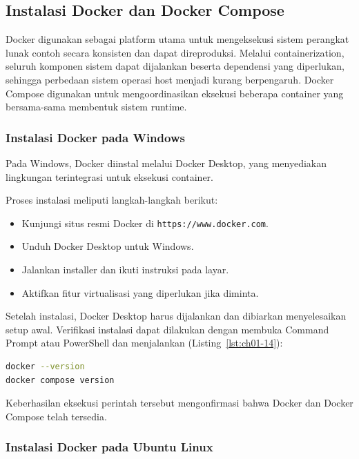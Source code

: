 \subsection{Instalasi Docker dan Docker Compose}

Docker digunakan sebagai platform utama untuk mengeksekusi sistem perangkat lunak
contoh secara konsisten dan dapat direproduksi. Melalui containerization, seluruh
komponen sistem dapat dijalankan beserta dependensi yang diperlukan, sehingga
perbedaan sistem operasi host menjadi kurang berpengaruh. Docker Compose digunakan
untuk mengoordinasikan eksekusi beberapa container yang bersama-sama membentuk
sistem runtime.

\subsubsection{Instalasi Docker pada Windows}

Pada Windows, Docker diinstal melalui Docker Desktop, yang menyediakan lingkungan
terintegrasi untuk eksekusi container.

Proses instalasi meliputi langkah-langkah berikut:

\begin{itemize}
  \item Kunjungi situs resmi Docker di \texttt{https://www.docker.com}.
  \item Unduh Docker Desktop untuk Windows.
  \item Jalankan installer dan ikuti instruksi pada layar.
  \item Aktifkan fitur virtualisasi yang diperlukan jika diminta.
\end{itemize}

Setelah instalasi, Docker Desktop harus dijalankan dan dibiarkan menyelesaikan
setup awal. Verifikasi instalasi dapat dilakukan dengan membuka Command Prompt
atau PowerShell dan menjalankan (Listing~\ref{lst:ch01-14}):

\begin{lstlisting}[language=bash, caption={Memeriksa versi Docker}, label={lst:ch01-14}]
docker --version
docker compose version
\end{lstlisting}

Keberhasilan eksekusi perintah tersebut mengonfirmasi bahwa Docker dan Docker
Compose telah tersedia.

\subsubsection{Instalasi Docker pada Ubuntu Linux}

